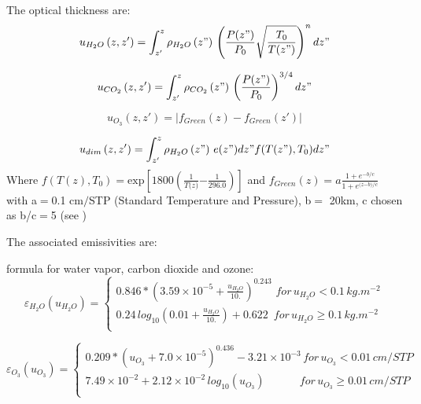 The optical thickness are:
\begin{equation}
u_{H_{2}O}\left( z,z' \right)=\int_{z'}^{z} \rho_{H_{2}O} \left( z" \right)\,
\left( \frac{P(z")}{P_{0}}\sqrt \frac{T_{0}}{T(z")} \right)^{n}dz"
\end{equation}

\begin{equation}
u_{CO_{2}}\left( z,z' \right)=\int_{z'}^{z} \rho_{CO_{2}} \left( z" \right)\,
\left( \frac{P(z")}{P_{0}} \right)^{3/4}dz"
\end{equation}

\begin{equation}
u_{O_{3}}\left( z,z' \right)=\left| f_{Green}\left( z
\right)-f_{Green}(z') \right|
\end{equation}

\begin{equation}
u_{dim}\left( z,z' \right)=\int_{z'}^{z} \rho_{H_{2}O} \left( z" \right)\,
e(z")dz"f(T(z"),T_{0})dz"
\end{equation}
Where $f\left( T\left( z \right)\mathrm{,}T_{\mathrm{0}}
\right)\mathrm{=exp}\left[ \mathrm{1800}\left(
\frac{\mathrm{1}}{T\mathrm{(}z\mathrm{)}}\mathrm{-}\frac{\mathrm{1}}{\mathrm{296.0}}
\right) \right]$ and $f_{Green}\left( z
\right)\mathrm{=}a\frac{\mathrm{1+}e^{\mathrm{-}b\mathrm{/}c}}{\mathrm{1+}e^{\mathrm{(}z\mathrm{-}b\mathrm{)/}c}}$
\newline
with a$=$0.1 cm$/$STP (Standard Temperature and Pressure), b$=$ 20km,
\newline
c chosen as b/c$=$5 (see \cite{Green:1964})

The associated emissivities are:

\cite{Sasamori:1968} formula for water vapor, carbon dioxide and ozone:
\begin{equation}
\varepsilon_{H_{2}O}\left( u_{H_{2}O} \right)=\left\{ {\begin{array}{l}
 0.846\ast \left( 3.59\times {10}^{-5}+\frac{u_{H_{2}O}}{10.} \right)^{0.243}\,
\, for\, u_{H_{2}O}<0.1\, kg.m^{-2} \\
 0.24\, {log}_{10}\left( 0.01+\frac{u_{H_{2}O}}{10.} \right)+0.622\, \, \,
for\, u_{H_{2}O}\ge 0.1\, kg.m^{-2} \\
 \end{array}} \right.
\end{equation}

\begin{equation}
\varepsilon_{O_{3}}\left( u_{O_{3}} \right)=\left\{ {\begin{array}{l}
 0.209\ast \left( u_{O_{3}}+7.0\times {10}^{-5} \right)^{0.436}-3.21\times
{10}^{-3}\, for\, u_{O_{3}}<0.01\, cm/STP \\
 7.49\times {10}^{-2}+2.12\times {10}^{-2}\, {log}_{10}\left( u_{O_{3}}
\right)\, \, \, \, \, \, \, \, \, \, \, \, \, \, \, \, \, \, \, for\,
{u_{O_{3}}\ge 0.01\, cm/STP} \\
 \end{array}} \right.
\end{equation}

